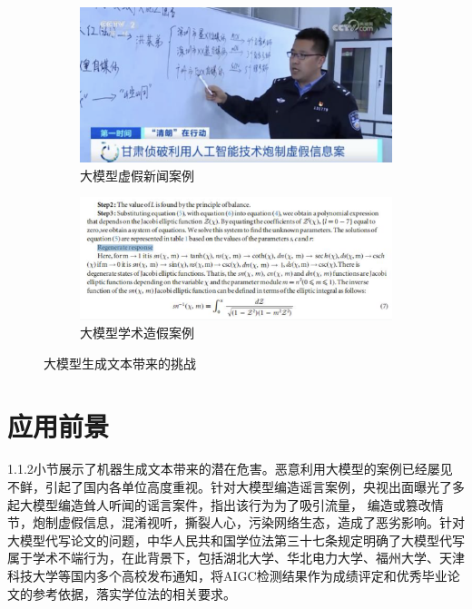 \documentclass[a4paper]{report}
\begin{document}
\begin{figure}[H]
	\centering
	\begin{subfigure}[b]{0.45\textwidth}
		\centering
		\includegraphics[width=\textwidth]{figures/fake_news.png}
		\caption{大模型虚假新闻案例}
		\label{fig:fake_news}
	\end{subfigure}
	\begin{subfigure}[b]{0.47\textwidth}
		\centering
		\includegraphics[width=\textwidth]{figures/fake_paper.png}
		\caption{大模型学术造假案例}
		\label{fig:fake_paper}
	\end{subfigure}
	\caption{大模型生成文本带来的挑战}
	\label{大模型生成文本带来的挑战}
\end{figure}

\section{应用前景}
1.1.2小节展示了机器生成文本带来的潜在危害。恶意利用大模型的案例已经屡见不鲜，引起了国内各单位高度重视。针对大模型编造谣言案例，央视出面曝光了多起大模型编造耸人听闻的谣言案件，指出该行为为了吸引流量， 编造或篡改情节，炮制虚假信息，混淆视听，撕裂人心，污染网络生态，造成了恶劣影响。针对大模型代写论文的问题，中华人民共和国学位法第三十七条规定明确了大模型代写属于学术不端行为，在此背景下，包括湖北大学、华北电力大学、福州大学、天津科技大学等国内多个高校发布通知，将AIGC检测结果作为成绩评定和优秀毕业论文的参考依据，落实学位法的相关要求。
\end{document}
